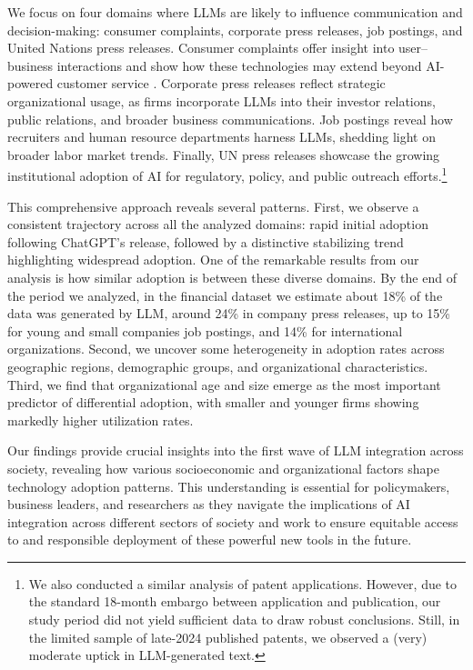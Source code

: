 We focus on four domains where LLMs are likely to influence communication and decision-making: consumer complaints, corporate press releases, job postings, and United Nations press releases. Consumer complaints offer insight into user–business interactions and show how these technologies may extend beyond AI-powered customer service \cite{Brynjolfsson2023}. Corporate press releases reflect strategic organizational usage, as firms incorporate LLMs into their investor relations, public relations, and broader business communications. Job postings reveal how recruiters and human resource departments harness LLMs, shedding light on broader labor market trends. Finally, UN press releases showcase the growing institutional adoption of AI for regulatory, policy, and public outreach efforts.\footnote{We also conducted a similar analysis of patent applications. However, due to the standard 18-month embargo between application and publication, our study period did not yield sufficient data to draw robust conclusions. Still, in the limited sample of late-2024 published patents, we observed a (very) moderate uptick in LLM-generated text.}

This comprehensive approach reveals several patterns. First, we observe a consistent trajectory across all the analyzed domains: rapid initial adoption following ChatGPT's release, followed by a distinctive stabilizing trend highlighting widespread adoption. One of the remarkable results from our analysis is how similar adoption is between these diverse domains. By the end of the period we analyzed, in the financial dataset we estimate about 18\% of the data was generated by LLM, around 24\% in company press releases, up to 15\% for young and small companies job postings, and 14\% for international organizations. Second, we uncover some heterogeneity in adoption rates across geographic regions, demographic groups, and organizational characteristics. Third, we find that organizational age and size emerge as the most important predictor of differential adoption, with smaller and younger firms showing markedly higher utilization rates. 

Our findings provide crucial insights into the first wave of LLM integration across society, revealing how various socioeconomic and organizational factors shape technology adoption patterns. This understanding is essential for policymakers, business leaders, and researchers as they navigate the implications of AI integration across different sectors of society and work to ensure equitable access to and responsible deployment of these powerful new tools in the future.
